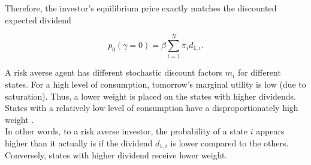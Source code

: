 \bigskip

\noindent Therefore, the investor's equilibrium price exactly matches the discounted expected dividend

\begin{equation*}
    p_0(\gamma = 0) =  \beta \sum_{i=1}^{N} \pi_i d_{1,i}.
\end{equation*}

\bigskip

\noindent A risk averse agent has different stochastic discount factors $m_i$ for different states. For a high level of consumption, tomorrow's marginal utility is low (due to saturation). Thus, a lower weight is placed on the states with higher dividends. States with a relatively low level of consumption have a disproportionately high weight \citep{dangl2021notes}.\\

\noindent In other words, to a risk averse investor, the probability of a state $i$ appears higher than it actually is if the dividend $d_{1,i}$ is lower compared to the others. Conversely, states with higher dividend receive lower weight.






